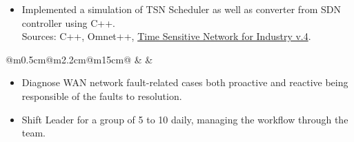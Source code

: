 \documentclass[10pt,a4paper]{article}
\begin{document}
\vspace{0.4em}
\begin{itemize}[leftmargin=*]
  \item Implemented a simulation of TSN Scheduler as well as converter from SDN controller using C++.\\ {\fontsize{10pt}{10pt}\selectfont\textcolor{blocktext2_color}{\fontsize{10pt}{10pt}\selectfont\textcolor{blocktext2_color}{Sources: C++, Omnet++, }}} {\fontsize{10pt}{10pt}\selectfont\textcolor{blocktext2_color}{\href{https://1.ieee802.org/tsn/}{Time Sensitive Network for Industry v.4}}}.       
\end{itemize}    


\vspace{1.3em}
\begin{tabular}{@{}m{0.5cm}@{\hspace{0.5em}}m{2.2cm}@{\hspace{0.5em}}m{15cm}@{}}
   & 
  \raisebox{1em}{\begin{minipage}[t]{\linewidth}
  \centering
    \textcolor{blocktitle1_color}{Jul. 11}\\
    \textcolor{blocktitle1_color}{Aug. 14}
  \end{minipage} 
  } &
\end{tabular} 


\vspace{0.4em}
\begin{itemize}[leftmargin=*]
  \item Diagnose WAN network fault-related cases both proactive and reactive being responsible of the faults to resolution.
  \item Shift Leader for a group of 5 to 10 daily, managing the workflow through the team. 
\end{itemize}
\end{document}
